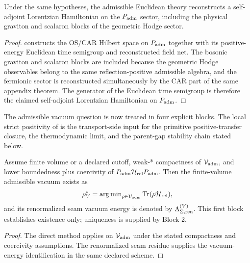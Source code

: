 \begin{theorem}
\label{thm:lorentzian-reconstruction}
Under the same hypotheses, the admissible Euclidean theory reconstructs a self-adjoint Lorentzian Hamiltonian on the $P_{\mathrm{adm}}$ sector, including the physical graviton and scalaron blocks of the geometric Hodge sector.
\end{theorem}

\begin{proof}
 constructs the OS/CAR Hilbert space on $P_{\mathrm{adm}}$ together
with its positive-energy Euclidean time semigroup and reconstructed field net. The bosonic graviton
and scalaron blocks are included because the geometric Hodge observables belong to the same
reflection-positive admissible algebra, and the fermionic sector is reconstructed simultaneously by
the CAR part of the same appendix theorem. The generator of the Euclidean time semigroup is
therefore the claimed self-adjoint Lorentzian Hamiltonian on $P_{\mathrm{adm}}$.
\end{proof}

The admissible vacuum question is now treated in four explicit blocks. The local strict positivity
of  is the transport-side input
for the primitive positive-transfer closure, the thermodynamic limit, and the parent-gap
stability chain stated below.

\begin{theorem}
\label{thm:admissible-vacuum-existence}
\label{thm:admissible-vacuum-finite-volume}
Assume finite volume or a declared cutoff, weak-* compactness of $\mathcal V_{\mathrm{adm}}$, and lower
boundedness plus coercivity of $P_{\mathrm{adm}}\mathcal H_{\mathrm{rel}}P_{\mathrm{adm}}$. Then the finite-volume admissible vacuum
exists as
\[
\rho^\ast_V=\operatorname{arg\,min}_{\rho\in\mathcal V_{\mathrm{adm}}}\operatorname{Tr}(\rho\mathcal H_{\mathrm{rel}}),
\]
and its renormalized seam vacuum energy is denoted by $\Lambda_{\Sigma,\mathrm{ren}}^{(V)}$. This
first block establishes existence only; uniqueness is supplied by Block 2.
\end{theorem}

\begin{proof}
The direct method applies on $\mathcal V_{\mathrm{adm}}$ under the stated compactness and coercivity assumptions.
The renormalized seam residue supplies the vacuum-energy identification in the same declared
scheme.
\end{proof}

